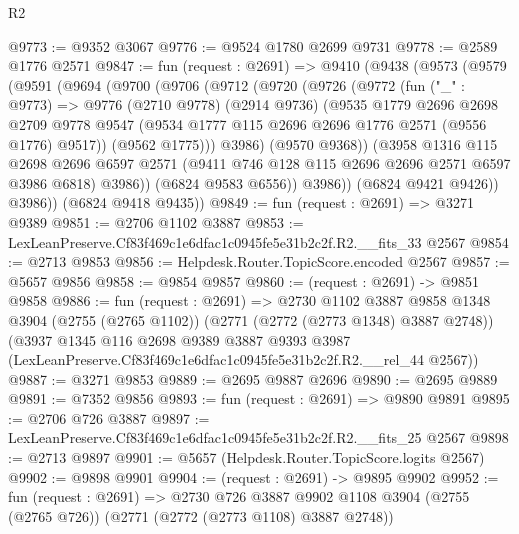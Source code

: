 \begin{lexlean}{R2}
\begin{coremodule}
@9773 := @9352 @3067
@9776 := @9524 @1780 @2699 @9731
@9778 := @2589 @1776 @2571
@9847 := fun (request : @2691) =>
  @9410
    (@9438
      (@9573
        (@9579
          (@9591
            (@9694
              (@9700
                (@9706
                  (@9712
                    (@9720
                      (@9726
                        (@9772
                          (fun ("_" : @9773) =>
                          @9776
                            (@2710 @9778)
                            (@2914 @9736)
                            (@9535
                              @1779
                              @2696
                              @2698
                              @2709
                              @9778
                              @9547
                              (@9534 @1777 @115 @2696 @2696 @1776 @2571 (@9556 @1776) @9517))
                            (@9562 @1775)))
                        @3986)
                      (@9570 @9368))
                    (@3958
                      @1316
                      @115
                      @2698
                      @2696
                      @6597
                      @2571
                      (@9411 @746 @128 @115 @2696 @2696 @2571 @6597 @3986 @6818)
                      @3986))
                  (@6824 @9583 @6556))
                @3986))
            (@6824 @9421 @9426))
          @3986))
      (@6824 @9418 @9435))
@9849 := fun (request : @2691) => @3271 @9389
@9851 := @2706 @1102 @3887
@9853 := LexLeanPreserve.Cf83f469c1e6dfac1c0945fe5e31b2c2f.R2.__fits_33 @2567
@9854 := @2713 @9853
@9856 := Helpdesk.Router.TopicScore.encoded @2567
@9857 := @5657 @9856
@9858 := @9854 @9857
@9860 := (request : @2691) -> @9851 @9858
@9886 := fun (request : @2691) =>
  @2730
    @1102
    @3887
    @9858
    @1348
    @3904
    (@2755 (@2765 @1102))
    (@2771 (@2772 (@2773 @1348) @3887 @2748))
    (@3937
      @1345
      @116
      @2698
      @9389
      @3887
      @9393
      @3987
      (LexLeanPreserve.Cf83f469c1e6dfac1c0945fe5e31b2c2f.R2.__rel_44 @2567))
@9887 := @3271 @9853
@9889 := @2695 @9887 @2696
@9890 := @2695 @9889
@9891 := @7352 @9856
@9893 := fun (request : @2691) => @9890 @9891
@9895 := @2706 @726 @3887
@9897 := LexLeanPreserve.Cf83f469c1e6dfac1c0945fe5e31b2c2f.R2.__fits_25 @2567
@9898 := @2713 @9897
@9901 := @5657 (Helpdesk.Router.TopicScore.logits @2567)
@9902 := @9898 @9901
@9904 := (request : @2691) -> @9895 @9902
@9952 := fun (request : @2691) =>
  @2730
    @726
    @3887
    @9902
    @1108
    @3904
    (@2755 (@2765 @726))
    (@2771 (@2772 (@2773 @1108) @3887 @2748))

\end{coremodule}
\end{lexlean}
